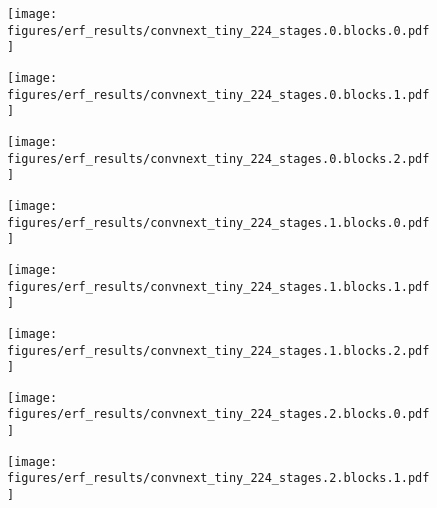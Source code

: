 \documentclass{article}
\begin{document}
\begin{figure}[tb]
  \raggedright
  \begin{minipage}[t]{0.13\hsize}
    \centering
    \texttt{[image: figures/erf\_results/convnext\_tiny\_224\_stages.0.blocks.0.pdf]}
    \label{figure:erf_convnext:0}
  \end{minipage}
  \begin{minipage}[t]{0.13\hsize}
    \centering
    \texttt{[image: figures/erf\_results/convnext\_tiny\_224\_stages.0.blocks.1.pdf]}
    \label{figure:erf_convnext:1}
  \end{minipage}
  \begin{minipage}[t]{0.13\hsize}
    \centering
    \texttt{[image: figures/erf\_results/convnext\_tiny\_224\_stages.0.blocks.2.pdf]}
    \label{figure:erf_convnext:2}
  \end{minipage}
  \begin{minipage}[t]{0.13\hsize}
    \centering
    \texttt{[image: figures/erf\_results/convnext\_tiny\_224\_stages.1.blocks.0.pdf]}
    \label{figure:erf_convnext:3}
  \end{minipage}
  \begin{minipage}[t]{0.13\hsize}
    \centering
    \texttt{[image: figures/erf\_results/convnext\_tiny\_224\_stages.1.blocks.1.pdf]}
    \label{figure:erf_convnext:4}
  \end{minipage}
  \begin{minipage}[t]{0.13\hsize}
    \centering
    \texttt{[image: figures/erf\_results/convnext\_tiny\_224\_stages.1.blocks.2.pdf]}
    \label{figure:erf_convnext:5}
  \end{minipage}
  \begin{minipage}[t]{0.13\hsize}
    \centering
    \texttt{[image: figures/erf\_results/convnext\_tiny\_224\_stages.2.blocks.0.pdf]}
    \label{figure:erf_convnext:6}
  \end{minipage}
  \begin{minipage}[t]{0.13\hsize}
    \centering
    \texttt{[image: figures/erf\_results/convnext\_tiny\_224\_stages.2.blocks.1.pdf]}
    \label{figure:erf_convnext:7}
  \end{minipage}
  \begin{minipage}[t]{0.13\hsize}
    \centering

\end{minipage}
\end{figure}
\end{document}
